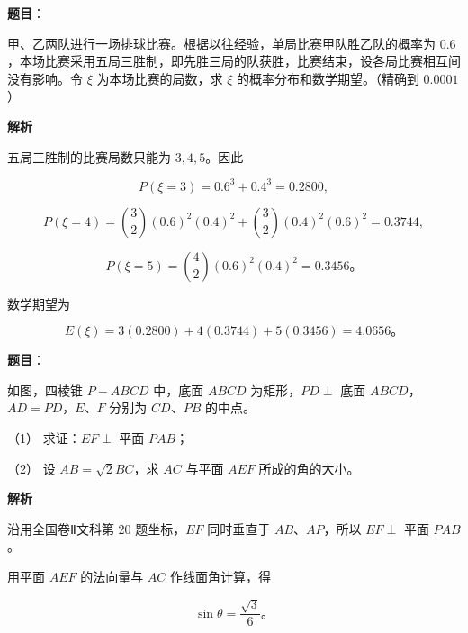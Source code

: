 \begin{answer}

\textbf{题目}：

甲、乙两队进行一场排球比赛。根据以往经验，单局比赛甲队胜乙队的概率为 $0.6$，本场比赛采用五局三胜制，即先胜三局的队获胜，比赛结束，设各局比赛相互间没有影响。令 $\xi$ 为本场比赛的局数，求 $\xi$ 的概率分布和数学期望。（精确到 $0.0001$）

\textbf{解析}

五局三胜制的比赛局数只能为 $3,4,5$。因此

\nopagebreak[4]
\[
P(\xi=3)=0.6^3+0.4^3=0.2800,
\]

\nopagebreak[4]
\[
P(\xi=4)=\binom32(0.6)^2(0.4)^2+\binom32(0.4)^2(0.6)^2=0.3744,
\]

\nopagebreak[4]
\[
P(\xi=5)=\binom42(0.6)^2(0.4)^2=0.3456\text{。}
\]

数学期望为

\nopagebreak[4]
\[
E(\xi)=3(0.2800)+4(0.3744)+5(0.3456)=4.0656\text{。}
\]


\end{answer}
\begin{answer}

\textbf{题目}：

如图，四棱锥 $P-ABCD$ 中，底面 $ABCD$ 为矩形，$PD\perp$ 底面 $ABCD$，$AD=PD$，$E\text{、}F$ 分别为 $CD\text{、}PB$ 的中点。
\nopagebreak[4]
\begin{center}\end{center}
\nopagebreak[4]
（1） 求证：$EF\perp$ 平面 $PAB$；

（2） 设 $AB=\sqrt2BC$，求 $AC$ 与平面 $AEF$ 所成的角的大小。

\textbf{解析}


沿用全国卷Ⅱ文科第 20 题坐标，$EF$ 同时垂直于 $AB\text{、}AP$，所以 $EF\perp$ 平面 $PAB$。


用平面 $AEF$ 的法向量与 $AC$ 作线面角计算，得

\nopagebreak[4]
\[
\sin\theta=\frac{\sqrt3}{6}\text{。}
\]



\end{answer}
